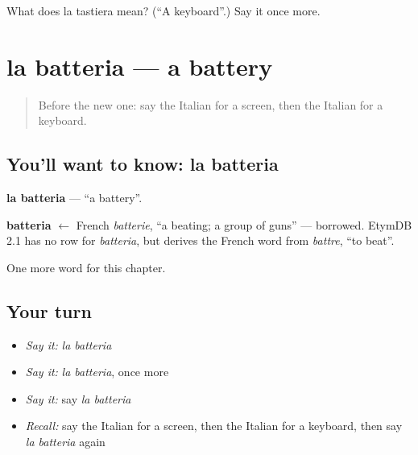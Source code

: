 \begin{tcolorbox}[breakable,colback=teal!4,colframe=teal!35!black,title={Before you move on}]
What does la tastiera mean? (\textquotedblleft{}A keyboard\textquotedblright{}.) Say it once more.
\end{tcolorbox}
\section[la batteria]{la batteria — a battery}

\label{lesson:IT-C162-batteria}



\begin{quote}
Before the new one: say the Italian for a screen, then the Italian for a keyboard.
\end{quote}

\subsection*{You'll want to know: la batteria}
\textbf{la batteria} — \textquotedblleft{}a battery\textquotedblright{}.

\begin{cousinweb}
\textbf{batteria} $\leftarrow$ French \emph{batterie}, \textquotedblleft{}a beating; a group of guns\textquotedblright{} — borrowed. EtymDB 2.1 has no row for \emph{batteria}, but derives the French word from \emph{battre}, \textquotedblleft{}to beat\textquotedblright{}.
\end{cousinweb}

\begin{grammarlens}[title={What you've built}]
One more word for this chapter.
\end{grammarlens}

\subsection*{Your turn}
\begin{itemize}
\raggedright
  \item \emph{Say it:} \emph{la batteria}
  \item \emph{Say it:} \emph{la batteria}, once more
  \item \emph{Say it:} say \emph{la batteria}
  \item \emph{Recall:} say the Italian for a screen, then the Italian for a keyboard, then say \emph{la batteria} again
\end{itemize}

